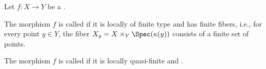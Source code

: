 \begin{definition} \label{definition:locally_quasifinite_morphism_of_schemes}
    Let $f: X \to Y$ be a .

    The morphism $f$ is called  if it is locally of finite type and has finite fibers, i.e., for every point $y \in Y$, the fiber $X_y = X \times_Y \Spec(\kappa(y))$ consists of a finite set of points.

    The morphism $f$ is called  if it is locally quasi-finite and .
\end{definition}
